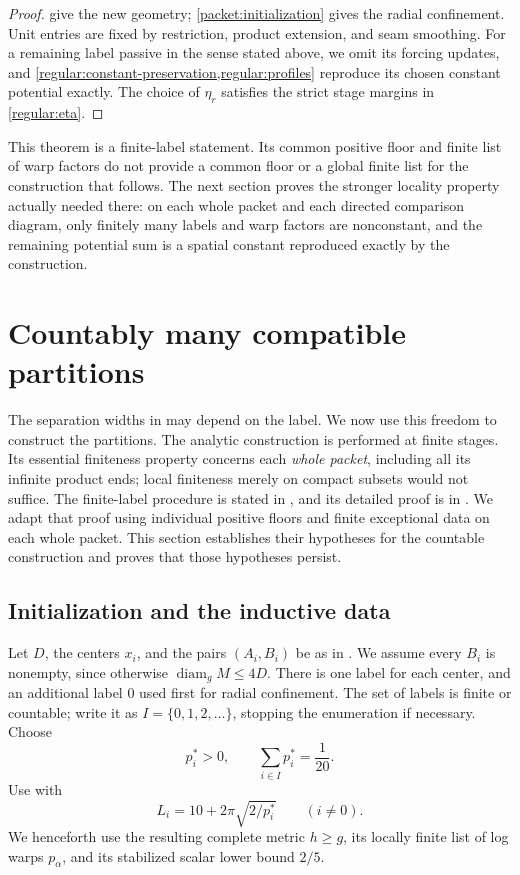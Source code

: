 \documentclass[11pt]{article}
\numberwithin{equation}{section}
\theoremstyle{definition}
\theoremstyle{remark}
\begin{document}
\begin{proof}
 give the
new geometry; \cref{packet:initialization} gives the radial confinement.
Unit entries are fixed by restriction, product extension, and seam
smoothing. For a remaining label passive in the sense stated above,
we omit its forcing updates, and
\cref{regular:constant-preservation,regular:profiles} reproduce its chosen
constant potential exactly. The choice of $\eta_r$ satisfies the strict
stage margins in \eqref{regular:eta}.
\end{proof}

This theorem is a finite-label statement. Its common positive floor and finite
list of warp factors do not provide a common floor or a global finite
list for the construction that follows. The next section proves the
stronger locality property actually needed there: on each whole packet
and each directed comparison diagram, only finitely many labels and warp
factors are nonconstant, and the remaining potential sum is a spatial
constant reproduced exactly by the construction.

\section{Countably many compatible partitions}\label{sec:countable}

The separation widths in  may depend on the label.
We now use this freedom to construct the partitions. The analytic
construction is performed at finite stages. Its essential finiteness
property concerns each \emph{whole packet}, including all its infinite
product ends; local finiteness merely on compact subsets would not
suffice. The finite-label procedure is stated in , and its detailed
proof is in .
We adapt that proof using individual positive floors and finite
exceptional data on each whole packet.
This section establishes their hypotheses for the countable construction
and proves that those hypotheses persist.

\subsection{Initialization and the inductive data}

Let $D$, the centers $x_i$, and the pairs $(A_i,B_i)$ be as in
. We assume every $B_i$ is nonempty, since otherwise
$\operatorname{diam}_g M\le4D$. There is one label for each center, and an additional
label $0$ used first for radial confinement. The set of labels is finite
or countable; write it as $I=\{0,1,2,\ldots\}$, stopping the enumeration
if necessary. Choose
\begin{equation}\label{countable:floors}
 p_i^*>0,\qquad \sum_{i\in I}p_i^*=\frac1{20}.
\end{equation}
Use  with
\begin{equation}\label{countable:widths}
 L_i=10+2\pi\sqrt{2/p_i^*}\qquad(i\ne0).
\end{equation}
We henceforth use the resulting complete metric $h\ge g$, its locally
finite list of log warps $p_\alpha$, and its stabilized scalar lower
bound $2/5$.
\end{document}
